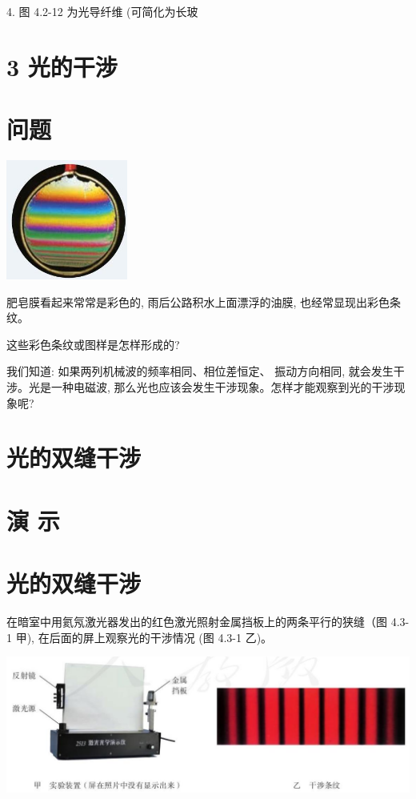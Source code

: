 \documentclass[10pt]{article}
\begin{document}
4. 图 4.2-12 为光导纤维 (可简化为长玻

\section*{3 光的干涉}

\section*{问题}

\begin{center}
\includegraphics[max width=0.3\textwidth]{images/01910e4c-ebb8-7d2c-8f2f-2375bc1d2d12_100_566283.jpg}
\end{center}

肥皂膜看起来常常是彩色的, 雨后公路积水上面漂浮的油膜, 也经常显现出彩色条纹。

这些彩色条纹或图样是怎样形成的?

我们知道: 如果两列机械波的频率相同、相位差恒定、 振动方向相同, 就会发生干涉。光是一种电磁波, 那么光也应该会发生干涉现象。怎样才能观察到光的干涉现象呢?

\section*{光的双缝干涉}

\section*{演 示}

\section*{光的双缝干涉}

在暗室中用氦氖激光器发出的红色激光照射金属挡板上的两条平行的狭缝（图 4.3-1 甲), 在后面的屏上观察光的干涉情况 (图 4.3-1 乙)。

\begin{center}
\includegraphics[max width=1.0\textwidth]{images/01910e4c-ebb8-7d2c-8f2f-2375bc1d2d12_100_774881.jpg}
\end{center}
\end{document}
